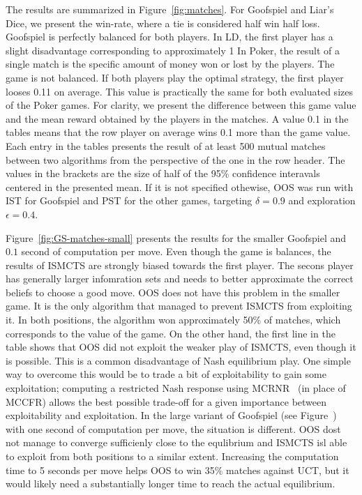 \documentclass{aamas2015}
\newcounter{mlNoteCounter}
\newcommand{\mlnote}[1]{{\scriptsize \color{darkgreen} $\blacksquare$ \refstepcounter{mlNoteCounter}\textsf{[ML]$_{\arabic{mlNoteCounter}}$:{#1}}}}
\renewcommand{\mlnote}[1]{}
\begin{document}


The results are summarized in Figure~\ref{fig:matches}.
For Goofspiel and Liar's Dice, we present the win-rate, where a tie is considered half win half loss. Goofspiel is perfectly balanced for both players. In LD, the first player has a slight disadvantage corresponding to approximately 1 \mlnote{...?} %
In Poker, the result of a single match is the specific amount of money won or lost by the players.
The game is not balanced. If both players play the optimal strategy, the first player looses 0.11 on average.
This value is practically the same for both evaluated sizes of the Poker games.
For clarity, we present the difference between this game value and the mean reward obtained by the players in the matches. A value 0.1 in the tables means that the row player on average wins 0.1 more than the game value.
Each entry in the tables presents the result of at least 500 mutual matches between two algorithms from the perspective of the one in the row header. The values in the brackets are the size of half of the 95\% confidence interavals centered in the presented mean. If it is not specified othewise, OOS was run with IST for Goofspiel and PST for the other games, targeting $\delta=0.9$ and exploration $\epsilon=0.4$.

Figure~\ref{fig:GS-matches-small} presents the results for the smaller Goofspiel and $0.1$ second of computation per move. Even though the game is balances, the results of ISMCTS are strongly biased towards the first player. The secons player has generally larger infomration sets and needs to better approximate the correct beliefs to choose a good move. OOS does not have this problem in the smaller game. It is the only algorithm that managed to prevent ISMCTS from exploiting it.
In both positions, the algorithm won approximately 50\% of matches, which corresponds to the value of the game.
On the other hand, the first line in the table shows that OOS did not exploit the weaker play of ISMCTS, even though it is possible. This is a common disadvantage of Nash equilibrium play. %
One simple way to overcome this would be to trade a bit of exploitability to gain some exploitation; computing a restricted Nash response using  MCRNR~\cite{Ponsen11Computing} (in place of MCCFR) allows the best possible trade-off for a given importance between exploitability and exploitation. 
In the large variant of Goofspiel (see Figure~\cite{fig:GS-matches-small}) with one second of computation per move, the situation is different. OOS dost not manage to converge sufficienly close to the equlibrium and ISMCTS isl able to exploit from both positions to a similar extent. Increasing the computation time to 5 seconds per move helps OOS to win 35\% matches against UCT, but it would likely need a substantially longer time to reach the actual equilibrium.
\end{document}

